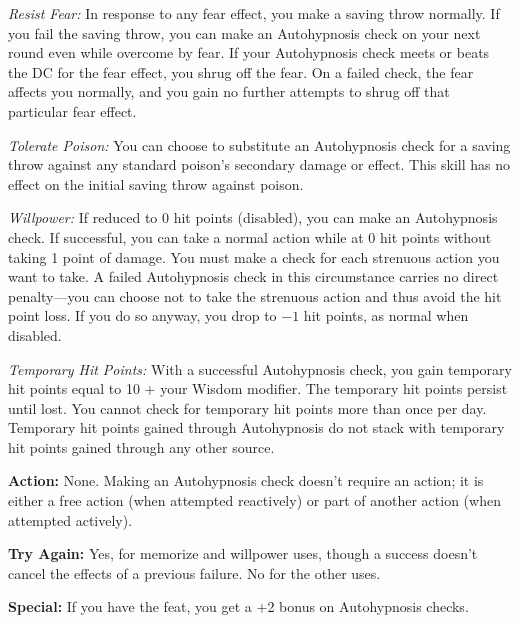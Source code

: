 \textit{Resist Fear:} In response to any fear effect, you make a saving throw normally. If you fail the saving throw, you can make an Autohypnosis check on your next round even while overcome by fear. If your Autohypnosis check meets or beats the DC for the fear effect, you shrug off the fear. On a failed check, the fear affects you normally, and you gain no further attempts to shrug off that particular fear effect.

\textit{Tolerate Poison:} You can choose to substitute an Autohypnosis check for a saving throw against any standard poison's secondary damage or effect. This skill has no effect on the initial saving throw against poison.

\textit{Willpower:} If reduced to 0 hit points (disabled), you can make an Autohypnosis check. If successful, you can take a normal action while at 0 hit points without taking 1 point of damage. You must make a check for each strenuous action you want to take. A failed Autohypnosis check in this circumstance carries no direct penalty---you can choose not to take the strenuous action and thus avoid the hit point loss. If you do so anyway, you drop to $-1$ hit points, as normal when disabled.

\textit{Temporary Hit Points:}	With a successful Autohypnosis check, you gain temporary hit points equal to 10 + your Wisdom modifier. The temporary hit points persist until lost. You cannot check for temporary hit points more than once per day. Temporary hit points gained through Autohypnosis do not stack with temporary hit points gained through any other source.

\textbf{Action:} None. Making an Autohypnosis check doesn't require an action; it is either a free action (when attempted reactively) or part of another action (when attempted actively).

\textbf{Try Again:} Yes, for memorize and willpower uses, though a success doesn't cancel the effects of a previous failure. No for the other uses.

\textbf{Special:} If you have the  feat, you get a +2 bonus on Autohypnosis checks.
